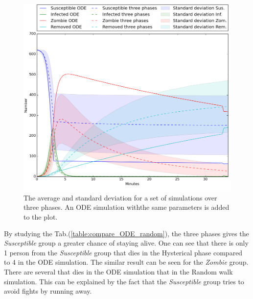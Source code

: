 \documentclass[%
twoside,                 %
final,                   %
chapterprefix=true,      %
open=right               %
10pt]{book}
\begin{document}
\begin{figure}[ht]
  \centerline{\includegraphics[width=0.8\linewidth]{3_fig/three_phases_ODE_sd.png}}
  \caption{
  The average and standard deviation for a set of simulations over three phases. An ODE simulation withthe same parameters is added to the plot.
  }
\end{figure}



By studying the Tab.(\ref{table:compare_ODE_random}), the three phases gives the \emph{Susceptible} group a greater chance of staying alive. One can see that there is only 1 person from the \emph{Susceptible} group that dies in the Hysterical phase compared to 4 in the ODE simulation. The similar result can be seen for the \emph{Zombie} group. There are several that dies in the ODE simulation that in the Random walk simulation. This can be explained by the fact that the \emph{Susceptible} group tries to avoid fights by running away. 

\label{table:compare_ODE_random}
\end{document}
